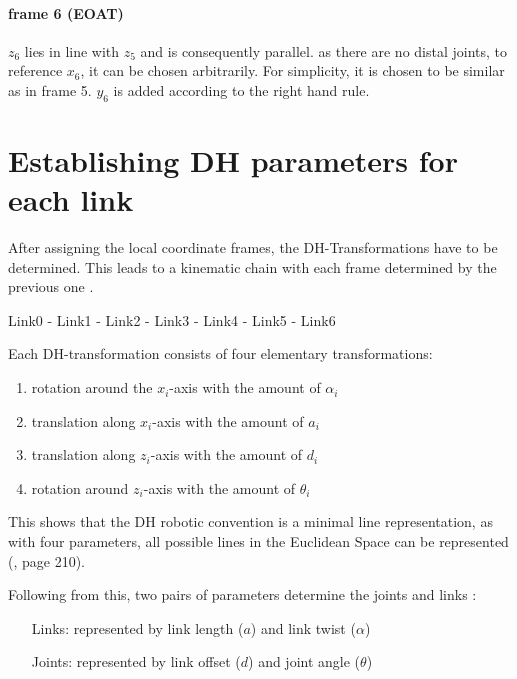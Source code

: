 \paragraph{frame 6 (EOAT)}
$z_6$ lies in line with $z_5$ and is consequently parallel.
as there are no distal joints, to reference $x_6$, it can be chosen arbitrarily. 
For simplicity, it is chosen to be similar as in frame 5. 
$y_6$ is added according to the right hand rule.

\section{Establishing \ac{DH} parameters for each link}

After assigning the local coordinate frames, the \ac{DH}-Transformations have to be determined. This leads to a kinematic chain with each frame determined by the previous one \cite{DenavitHartenbergKonventionen}.

Link0 - Link1 - Link2 - Link3 - Link4 - Link5 - Link6

Each \ac{DH}-transformation consists of four elementary transformations\cite{DenavitHartenbergKonventionen}:

\begin{enumerate}[label=\emph{\arabic*)}]
	\item rotation around the $x_i$-axis with the amount of $\alpha_i$
	\item translation along $x_i$-axis with the amount of  $a_i$
	\item translation along $z_i$-axis with the amount of  $d_i$
	\item rotation around $z_i$-axis with the amount of  $\theta_i$
\end{enumerate}

This shows that the \ac{DH} robotic convention is a minimal line representation, as with four parameters, all possible lines in the Euclidean Space can be represented (\cite{AutRobVeh}, page 210).

Following from this, two pairs of parameters determine the joints and links \cite{ConstantinForwardKA}:
\begin{itemize}[wide=\parindent] 
	\item[Links:] represented by link length ($a$) and link twist ($\alpha$)
	\item[Joints:] represented by link offset ($d$)
	and joint angle ($\theta$) 
\end{itemize}

